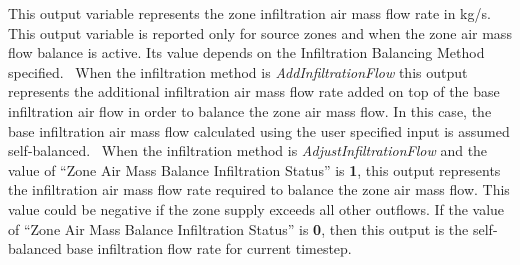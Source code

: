 This output variable represents the zone infiltration air mass flow rate in kg/s.~ This output variable is reported only for source zones and when the zone air mass flow balance is active. Its value depends on the Infiltration Balancing Method specified.~ When the infiltration method is \emph{AddInfiltrationFlow} this output represents the additional infiltration air mass flow rate added on top of the base infiltration air flow in order to balance the zone air mass flow. In this case, the base infiltration air mass flow calculated using the user specified input is assumed self-balanced.~ When the infiltration method is \emph{AdjustInfiltrationFlow} and the value of ``Zone Air Mass Balance Infiltration Status'' is \textbf{1}, this output represents the infiltration air mass flow rate required to balance the zone air mass flow. This value could be negative if the zone supply exceeds all other outflows. If the value of ``Zone Air Mass Balance Infiltration Status'' is \textbf{0}, then this output is the self-balanced base infiltration flow rate for current timestep.